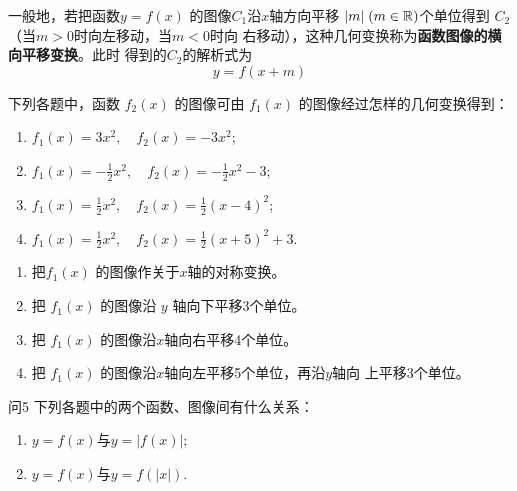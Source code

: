 一般地，若把函数$y=f(x)$
的图像$C_1$沿$x$轴方向平移
$|m|\; (m\in\mathbb{R})$个单位得到
$C_2$（当$m>0$时向左移动，当$m<0$时向
右移动），这种几何变换称为\textbf{函数图像的横向平移变换}。此时
得到的$C_2$的解析式为
\[y=f(x+m)\]

\begin{example}
    下列各题中，函数
$f_2(x)$
的图像可由
$f_1(x)$
的图像经过怎样的几何变换得到：
\begin{enumerate}[(1)]
    \item $f_1(x)=3x^2,\quad f_2(x)=-3x^2$;
    \item $f_1(x)=-\frac{1}{2}x^2,\quad f_2(x)=-\frac{1}{2}x^2-3$;
    \item $f_1(x)=\frac{1}{2}x^2,\quad f_2(x)=\frac{1}{2}(x-4)^2$;
    \item $f_1(x)=\frac{1}{2}x^2,\quad f_2(x)=\frac{1}{2}(x+5)^2+3$.
\end{enumerate}
\end{example}

\begin{solution}
\begin{enumerate}[(1)]
    \item 把$f_1(x)$
    的图像作关于$x$轴的对称变换。
    \item 把    $f_1(x)$
    的图像沿
    $y$
    轴向下平移3个单位。
    \item 把    $f_1(x)$
    的图像沿$x$轴向右平移4个单位。
    \item 把    $f_1(x)$
    的图像沿$x$轴向左平移5个单位，再沿$y$轴向
    上平移3个单位。
\end{enumerate}
\end{solution}

\begin{thm}{问5}
    下列各题中的两个函数、图像间有什么关系：
\begin{enumerate}[(1)]
    \item $y=f(x)$与$y=|f(x)|$;
    \item  $y=f(x)$与$y=f(|x|)$.
\end{enumerate}
\end{thm}

